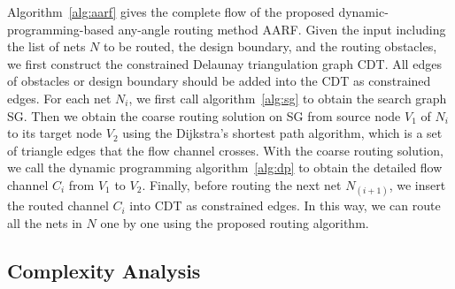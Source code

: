 \documentclass[journal]{IEEEtran}
\begin{document}
Algorithm~\ref{alg:aarf} gives the complete flow of the proposed dynamic-programming-based any-angle routing method AARF. 
Given the input including the list of nets $N$ to be routed, the design boundary, and the routing obstacles, we first construct the constrained Delaunay triangulation graph CDT. 
All edges of obstacles or design boundary should be added into the CDT as constrained edges. 
For each net $N_i$, we first call algorithm~\ref{alg:sg} to obtain the search graph SG. 
Then we obtain the coarse routing solution on SG from source node $V_1$ of $N_i$ to its target node $V_2$ using the Dijkstra's shortest path algorithm, which is a set of triangle edges that the flow channel crosses. 
With the coarse routing solution, we call the dynamic programming algorithm~\ref{alg:dp} to obtain the detailed flow channel $C_i$ from $V_1$ to $V_2$. 
Finally, before routing the next net $N_{(i+1)}$, we insert the routed channel $C_i$ into CDT as constrained edges. 
In this way, we can route all the nets in $N$ one by one using the proposed routing algorithm.

\subsection{Complexity Analysis}
\label{complex}
\end{document}
